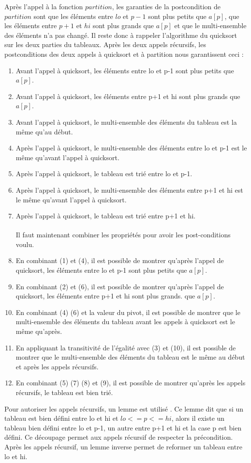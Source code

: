 \documentclass[11pt,openany]{article}
\begin{document}
		Apr\`es l'appel \`a la fonction $partition$, les garanties de la postcondition de $partition$ sont que les \'el\'ements entre $lo$ et $p-1$ sont plus petits que $a[p]$, que les \'el\'ements entre $p+1$ et $hi$ sont plus grands que $a[p]$ et que le multi-ensemble des \'el\'ements n'a pas chang\'e. Il reste donc \`a rappeler l'algorithme du quicksort sur les deux parties du tableaux. Apr\`es les deux appels r\'ecursifs, les postconditions des deux appels \`a quicksort et \`a partition nous garantissent ceci :
		\begin{enumerate}
			\item Avant l'appel \`a quicksort, les \'el\'ements entre lo et p-1 sont plus petits que $a[p]$.
			\item Avant l'appel \`a quicksort, les \'el\'ements entre p+1 et hi sont plus grands que $a[p]$.
			\item Avant l'appel \`a quicksort, le multi-ensemble des \'el\'ements du tableau est la m\^eme qu'au d\'ebut.
			\item Apr\`es l'appel \`a quicksort, le multi-ensemble des \'el\'ements entre lo et p-1 est le m\^eme qu'avant l'appel \`a quicksort.
			\item Apr\`es l'appel \`a quicksort, le tableau est tri\'e entre lo et p-1.
			\item Apr\`es l'appel \`a quicksort, le multi-ensemble des \'el\'ements entre p+1 et hi est le m\^eme qu'avant l'appel \`a quicksort.
			\item Apr\`es l'appel \`a quicksort, le tableau est tri\'e entre p+1 et hi.\\ \\
			Il faut maintenant combiner les propri\'et\'es pour avoir les post-conditions voulu.
			\item En combinant (1) et (4), il est possible de montrer qu'apr\`es l'appel de quicksort, les \'el\'ements entre lo et p-1 sont plus petits que $a[p]$.
			\item En combinant (2) et (6), il est possible de montrer qu'apr\`es l'appel de quicksort, les \'el\'ements entre p+1 et hi sont plus grands. que $a[p]$.
			\item En combinant (4) (6) et la valeur du pivot, il est possible de montrer que le multi-ensemble des \'el\'ements du tableau avant les appels \`a quicksort est le m\^eme qu'apr\`es.
			\item En appliquant la transitivit\'e de l'\'egalit\'e avec (3) et (10), il est possible de montrer que le multi-ensemble des \'el\'ements du tableau est le m\^eme au d\'ebut et apr\`es les appels r\'ecursifs.
			\item En combinant (5) (7) (8) et (9), il est possible de montrer qu'apr\`es les appels r\'ecursifs, le tableau est bien tri\'e.
		\end{enumerate}
		Pour autoriser les appels r\'ecursifs, un lemme est utilis\'e . Ce lemme dit que si un tableau est bien d\'efini entre lo et hi et $lo <= p<=hi$, alors il existe un tableau bien d\'efini entre lo et p-1, un autre entre p+1 et hi et la case p est bien d\'efini. Ce d\'ecoupage permet aux appels r\'ecursif de respecter la pr\'econdition. Apr\`es les appels r\'ecursif, un lemme inverse permet de reformer un tableau entre lo et hi.
		
\end{document}

